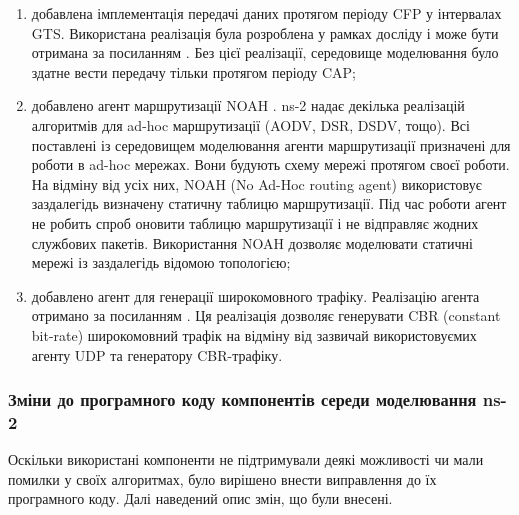 \documentclass[a4paper,ukrainian,utf8,nocolumnsxix,floatsection,equationsection]{eskdtext}
\renewcommand\paragraph{\subsubsection}
\begin{document}
\begin{enumerate}
	\item добавлена імплементація передачі даних протягом періоду CFP у інтервалах GTS. Використана реалізація була розроблена у рамках досліду \cite{ns2:with:cfp} і може бути отримана за посиланням \cite{ns2:with:cfp:sources}. Без цієї реалізації, середовище моделювання було здатне вести передачу тільки протягом періоду CAP;

	\item добавлено агент маршрутизації NOAH \cite{ns2:noah}. ns-2 надає декілька реалізацій алгоритмів для ad-hoc маршрутизації (AODV, DSR, DSDV, тощо). Всі поставлені із середовищем моделювання агенти маршрутизації призначені для роботи в ad-hoc мережах. Вони будують схему мережі протягом своєї роботи. На відміну від усіх них, NOAH (No Ad-Hoc routing agent) використовує заздалегідь визначену статичну таблицю маршрутизації. Під час роботи агент не робить спроб оновити таблицю маршрутизації і не відправляє жодних службових пакетів. Використання NOAH дозволяє моделювати статичні мережі із заздалегідь відомою топологією;

	\item добавлено агент для генерації широкомовного трафіку. Реалізацію агента отримано за посиланням \cite{ns2:broadcastapp}. Ця реалізація дозволяє генерувати CBR (constant bit-rate) широкомовний трафік на відміну від зазвичай використовуємих агенту UDP та генератору CBR-трафіку.

\end{enumerate}

\paragraph{Зміни до програмного коду компонентів середи моделювання ns-2}

Оскільки використані компоненти не підтримували деякі можливості чи мали помилки у своїх алгоритмах, було вирішено внести виправлення до їх програмного коду. Далі наведений опис змін, що були внесені. 
\end{document}
